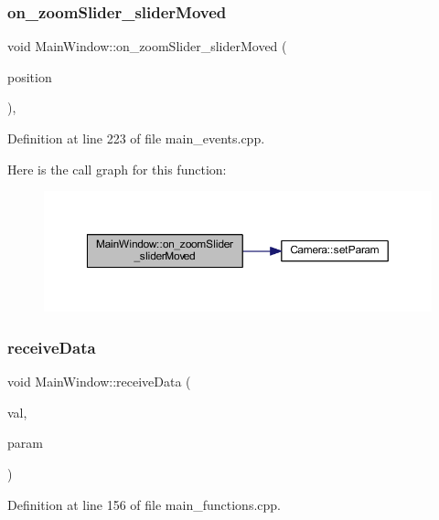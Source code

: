 \subsubsection{\texorpdfstring{on\_zoomSlider\_sliderMoved}{on\_zoomSlider\_sliderMoved}}
{\footnotesize\ttfamily void Main\+Window\+::on\+\_\+zoom\+Slider\+\_\+slider\+Moved (\begin{DoxyParamCaption}\item[{int}]{position }\end{DoxyParamCaption})\hspace{0.3cm}{\ttfamily [private]}, {\ttfamily [slot]}}



Definition at line 223 of file main\+\_\+events.\+cpp.

Here is the call graph for this function\+:
\nopagebreak
\begin{figure}[H]
\begin{center}
\leavevmode
\includegraphics[width=350pt]{classMainWindow_a6ae3fbe8e4f3f10db4f2e0e495b98841_cgraph}
\end{center}
\end{figure}
\mbox{\label{classMainWindow_ac7fa2374f28a46ed205758559114d79f}} 
\subsubsection{\texorpdfstring{receiveData}{receiveData}}
{\footnotesize\ttfamily void Main\+Window\+::receive\+Data (\begin{DoxyParamCaption}\item[{unsigned int}]{val,  }\item[{Q\+String}]{param }\end{DoxyParamCaption})\hspace{0.3cm}{\ttfamily [slot]}}



Definition at line 156 of file main\+\_\+functions.\+cpp.

